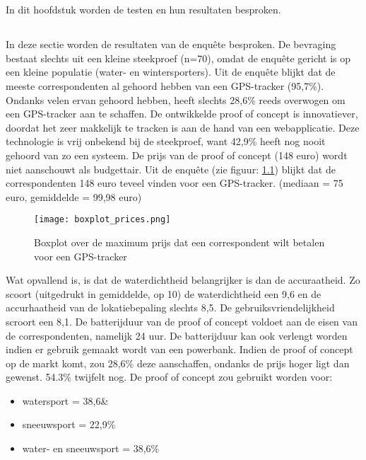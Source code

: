 \chapter{}
\label{ch:resultaten}
In dit hoofdstuk worden de testen en hun resultaten besproken.
\section{}
In deze sectie worden de resultaten van de enquête besproken.
\newline
De bevraging bestaat slechts uit een kleine steekproef (n=70), omdat de enquête gericht is op een kleine populatie (water- en wintersporters). Uit de enquête blijkt dat de meeste correspondenten al gehoord hebben van een GPS-tracker (95,7\%). Ondanks velen ervan gehoord hebben, heeft slechts 28,6\% reeds overwogen om een GPS-tracker aan te schaffen. De ontwikkelde proof of concept is innovatiever, doordat het zeer makkelijk te tracken is aan de hand van een webapplicatie. Deze technologie is vrij onbekend bij de steekproef, want 42,9\% heeft nog nooit gehoord van zo een systeem. 
\newline
De prijs van de proof of concept (148 euro) wordt niet aanschouwt als budgettair. Uit de enquête (zie figuur: \ref{graph:price}) blijkt dat de correspondenten 148 euro teveel vinden voor een GPS-tracker. (mediaan = 75 euro, gemiddelde = 99,98 euro) 
\begin{figure}
	\texttt{[image: boxplot\_prices.png]}
	\caption{Boxplot over de maximum prijs dat een correspondent wilt betalen voor een GPS-tracker}
	\label{graph:price}
\end{figure}
\newline
Wat opvallend is, is dat de waterdichtheid belangrijker is dan de accuraatheid. Zo scoort (uitgedrukt in gemiddelde, op 10) de waterdichtheid een 9,6 en de accurhaatheid van de lokatiebepaling slechts 8,5. De gebruiksvriendelijkheid scroort een 8,1. 
\newline
De batterijduur van de proof of concept voldoet aan de eisen van de correspondenten, namelijk 24 uur. De batterijduur kan ook verlengt worden indien er gebruik gemaakt wordt van een powerbank.
\newline
Indien de proof of concept op de markt komt, zou 28,6\% deze aanschaffen, ondanks de prijs hoger ligt dan gewenst. 54.3\% twijfelt nog. 
\newline
De proof of concept zou gebruikt worden voor:
\begin{itemize}
	\item watersport = 38,6\&
	\item sneeuwsport = 22,9\%
	\item water- en sneeuwsport = 38,6\%
\end{itemize}
\pagebreak
